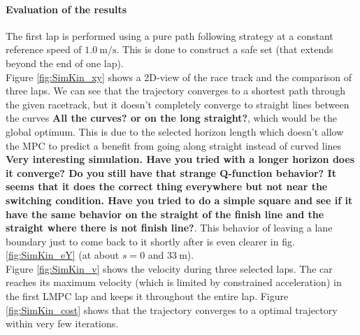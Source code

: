 \paragraph{Evaluation of the results}
The first lap is performed using a pure path following strategy at a constant reference speed of $\SI{1.0}{\meter\per\second}$. This is done to construct a safe set (that extends beyond the end of one lap).\\
Figure \ref{fig:SimKin_xy} shows a 2D-view of the race track and the comparison of three laps. We can see that the trajectory converges to a shortest path through the given racetrack, but it doesn't completely converge to straight lines between the curves {\bfseries{All the curves? or on the long straight?}}, which would be the global optimum. This is due to the selected horizon length which doesn't allow the MPC to predict a benefit from going along straight instead of curved lines {\bfseries{Very interesting simulation. Have you tried with a longer horizon does it converge? Do you still have that strange Q-function behavior? It seems that it does the correct thing everywhere but not near the switching condition. Have you tried to do a simple square and see if it have the same behavior on the straight of the finish line and the straight where there is not finish line?}}. This behavior of leaving a lane boundary just to come back to it shortly after is even clearer in fig. \ref{fig:SimKin_eY} (at about $s=0$ and $\SI{33}{\meter}$).\\
Figure \ref{fig:SimKin_v} shows the velocity during three selected laps. The car reaches its maximum velocity (which is limited by constrained acceleration) in the first LMPC lap and keeps it throughout the entire lap. Figure \ref{fig:SimKin_cost} shows that the trajectory converges to a optimal trajectory within very few iterations.
